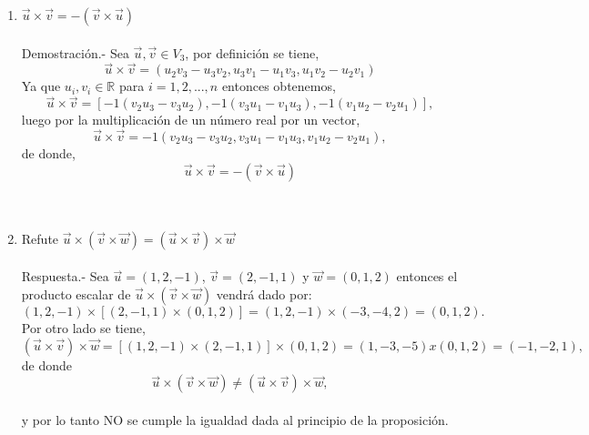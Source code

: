 \begin{enumerate}

\item $\vec{u} \times \vec{v} = -(\vec{v}\times \vec{u})$\\\\
    Demostración.-\;  Sea $\vec{u}, \vec{v} \in V_3$, por definición se tiene, $$\vec{u}\times \vec{v} = \left(u_2 v_3 - u_3v_2, u_3v_1-u_1v_3,u_1v_2 - u_2v_1\right)$$
	Ya que $u_i,v_i \in \mathbb{R}$ para $i=1,2,...,n$ entonces obtenemos, $$\vec{u}\times \vec{v} = \left[-1(v_2u_3 - v_3u_2),-1(v_3u_1 - v_1u_3),-1(v_1u_2 - v_2u_1)  \right],$$
	luego por la multiplicación de un número real por un vector, $$\vec{u}\times \vec{v} =-1\left(v_2u_3 - v_3u_2 ,v_3u_1 - v_1u_3,v_1u_2 - v_2u_1 \right),$$
	de donde, $$\vec{u}\times \vec{v} =-\left(\vec{v}\times \vec{u}\right)$$\\\\

\item Refute $\vec{u}\times\left(\vec{v}\times \vec{w}\right) = \left(\vec{u}\times \vec{v}\right)\times \vec{w}$\\\\
    Respuesta.-\; Sea $\vec{u}=(1,2,-1)$, $\vec{v}=(2,-1,1)$ y $\vec{w} = (0,1,2)$ entonces el producto escalar de $\vec{u}\times\left(\vec{v}\times \vec{w}\right)$ vendrá dado por:
	$$(1,2,-1)\times\left[(2,-1,1)\times (0,1,2)\right] = (1,2,-1)\times (-3,-4,2) = (0,1,2).$$
	Por otro lado se tiene,
	$$\left(\vec{u}\times \vec{v}\right)\times \vec{w} = \left[(1,2,-1)\times (2,-1,1)\right]\times (0,1,2) = (1,-3,-5)x(0,1,2) = (-1,-2,1),$$
	de  donde $$\vec{u}\times\left(\vec{v}\times \vec{w}\right) \neq \left(\vec{u}\times \vec{v}\right)\times \vec{w},$$\\
	y por lo tanto NO se cumple la igualdad dada al principio de la proposición.\\\\

	
	

\end{enumerate}
